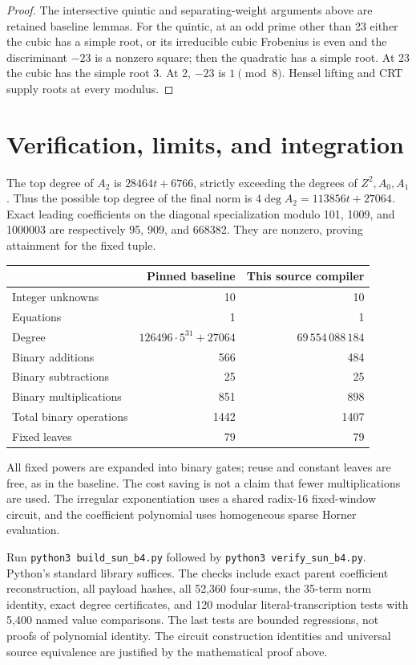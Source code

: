 \documentclass[11pt]{article}
\begin{document}
\begin{proof}
The intersective quintic and separating-weight arguments above are
retained baseline lemmas. For the quintic, at an odd prime other than 23
either the cubic has a simple root, or its irreducible cubic Frobenius is
even and the discriminant $-23$ is a nonzero square; then the quadratic
has a simple root. At 23 the cubic has the simple root 3. At 2, $-23$ is
$1\pmod8$. Hensel lifting and CRT supply roots at every modulus.
\end{proof}

\section{Verification, limits, and integration}
The top degree of $A_2$ is $28464t+6766$, strictly exceeding the degrees
of $Z^2,A_0,A_1$. Thus the possible top degree of the final norm is
$4\deg A_2=113856t+27064$. Exact leading coefficients on the diagonal
specialization modulo 101, 1009, and 1000003 are respectively 95, 909,
and 668382. They are nonzero, proving attainment for the fixed tuple.

\begin{center}\begin{tabular}{lrr}
\toprule
 &Pinned baseline&This source compiler\\\midrule
Integer unknowns&10&10\\
Equations&1&1\\
Degree&$126496\cdot5^{31}+27064$&$69\,554\,088\,184$\\
Binary additions&566&484\\
Binary subtractions&25&25\\
Binary multiplications&851&898\\
Total binary operations&1442&1407\\
Fixed leaves&79&79\\\bottomrule
\end{tabular}\end{center}
All fixed powers are expanded into binary gates; reuse and constant leaves
are free, as in the baseline. The cost saving is not a claim that fewer
multiplications are used. The irregular exponentiation uses a shared
radix-16 fixed-window circuit, and the coefficient polynomial uses
homogeneous sparse Horner evaluation.

Run \texttt{python3 build\_sun\_b4.py} followed by
\texttt{python3 verify\_sun\_b4.py}. Python's standard library suffices.
The checks include exact parent coefficient reconstruction, all payload
hashes, all 52,360 four-sums, the 35-term norm identity, exact degree
certificates, and 120 modular literal-transcription tests with 5,400 named
value comparisons. The last tests are bounded regressions, not proofs of
polynomial identity. The circuit construction identities and universal
source equivalence are justified by the mathematical proof above.
\end{document}
